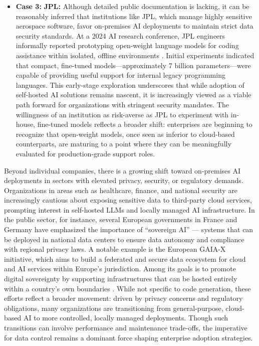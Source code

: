 \begin{itemize}
	\item \textbf{Case 3:} \textbf{JPL:} Although detailed public documentation is lacking, it can be reasonably inferred that institutions like JPL, which manage highly sensitive aerospace software, favor on-premises \gls{AI} deployments to maintain strict data security standards. At a 2024 \gls{AI} research conference, JPL engineers informally reported prototyping open-weight language models for coding assistance within isolated, offline environments \autocite{JPL2024}. Initial experiments indicated that compact, fine-tuned models—approximately 7 billion parameters—were capable of providing useful support for internal legacy programming languages. This early-stage exploration underscores that while adoption of self-hosted \gls{AI} solutions remains nascent, it is increasingly viewed as a viable path forward for organizations with stringent security mandates. The willingness of an institution as risk-averse as JPL to experiment with in-house, fine-tuned models reflects a broader shift: enterprises are beginning to recognize that open-weight models, once seen as inferior to cloud-based counterparts, are maturing to a point where they can be meaningfully evaluated for production-grade support roles.
\end{itemize}

Beyond individual companies, there is a growing shift toward on-premises \gls{AI} deployments in sectors with elevated privacy, security, or regulatory demands. Organizations in areas such as healthcare, finance, and national security are increasingly cautious about exposing sensitive data to third-party cloud services, prompting interest in self-hosted \glspl{LLM} and locally managed \gls{AI} infrastructure. In the public sector, for instance, several European governments in France and Germany have emphasized the importance of “sovereign AI” — systems that can be deployed in national data centers to ensure data autonomy and compliance with regional privacy laws. A notable example is the European GAIA-X initiative, which aims to build a federated and secure data ecosystem for cloud and \gls{AI} services within Europe’s jurisdiction. Among its goals is to promote digital sovereignty by supporting infrastructures that can be hosted entirely within a country’s own boundaries \autocite{GaiaXHub2024}. While not specific to code generation, these efforts reflect a broader movement: driven by privacy concerns and regulatory obligations, many organizations are transitioning from general-purpose, cloud-based \gls{AI} to more controlled, locally managed deployments. Though such transitions can involve performance and maintenance trade-offs, the imperative for data control remains a dominant force shaping enterprise adoption strategies.

